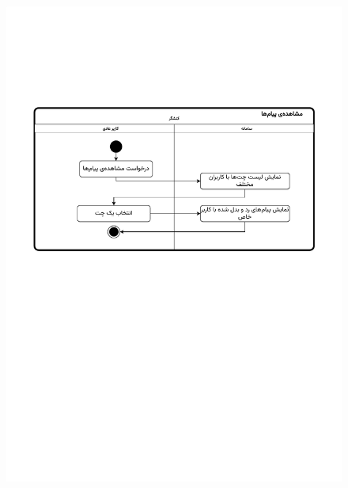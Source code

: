 \begin{figure}[ht!]
	\centering
	\includegraphics[scale=0.8, page=1]{figs/OOD-activity-chat.pdf}
\end{figure}
\FloatBarrier
\newpage

